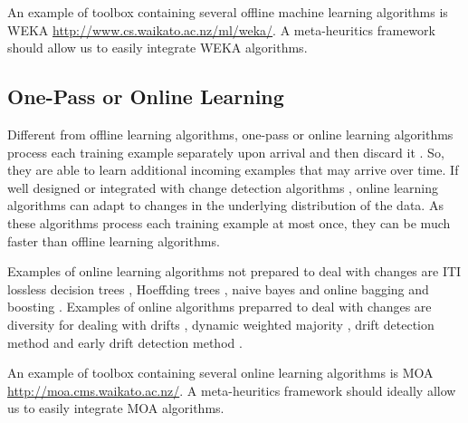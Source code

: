 \documentclass{article}
\begin{document}
An example of toolbox containing several offline machine learning algorithms is WEKA \url{http://www.cs.waikato.ac.nz/ml/weka/}. A meta-heuritics framework should allow us to easily integrate WEKA algorithms.

\subsection{One-Pass or Online Learning}

Different from offline learning algorithms, one-pass or online learning algorithms process each training example separately upon arrival and then discard it \cite{OzaRussell2001,FernGivan2003}. So, they are able to learn additional incoming examples that may arrive over time. If well designed or integrated with change detection algorithms \cite{GamaEtAl2004,AlippiRoveri2008}, online learning algorithms can adapt to changes in the underlying distribution of the data. As these algorithms process each training example at most once, they can be much faster than offline learning algorithms. 

Examples of online learning algorithms not prepared to deal with changes are ITI lossless decision trees \cite{UtgoffBerkmanClouse1997}, Hoeffding trees \cite{HultenSpencerDomingos}, naive bayes \cite{Bishop2006} and online bagging and boosting \cite{OzaRussell2001}. Examples of online algorithms preparred to deal with changes are diversity for dealing with drifts \cite{MinkuYao2012}, dynamic weighted majority \cite{KolterMaloof2007}, drift detection method \cite{GamaEtAl2004} and early drift detection method \cite{GarciaEtAl2006}.

An example of toolbox containing several online learning algorithms is MOA \url{http://moa.cms.waikato.ac.nz/}. A meta-heuritics framework should ideally allow us to easily integrate MOA algorithms.




\end{document}
